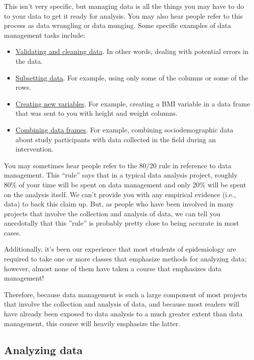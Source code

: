 \documentclass[
  letterpaper,
  DIV=11,
  numbers=noendperiod]{scrreprt}
\providecommand{\tightlist}{%
  \setlength{\itemsep}{0pt}\setlength{\parskip}{0pt}}\usepackage{longtable,booktabs,array}
\begin{document}
This isn't very specific, but managing data is all the things you may
have to do to your data to get it ready for analysis. You may also hear
people refer to this process as data wrangling or data munging. Some
specific examples of data management tasks include:

\begin{itemize}
\tightlist
\item
  \ul{Validating and cleaning data}. In other words, dealing with
  potential errors in the data.\\
\item
  \ul{Subsetting data}. For example, using only some of the columns or
  some of the rows.\\
\item
  \ul{Creating new variables}. For example, creating a BMI variable in a
  data frame that was sent to you with height and weight columns.\\
\item
  \ul{Combining data frames}. For example, combining sociodemographic
  data about study participants with data collected in the field during
  an intervention.
\end{itemize}

You may sometimes hear people refer to the 80/20 rule in reference to
data management. This ``rule'' says that in a typical data analysis
project, roughly 80\% of your time will be spent on data management and
only 20\% will be spent on the analysis itself. We can't provide you
with any empirical evidence (i.e., data) to back this claim up. But, as
people who have been involved in many projects that involve the
collection and analysis of data, we can tell you anecdotally that this
''rule'' is probably pretty close to being accurate in most cases.

Additionally, it's been our experience that most students of
epidemiology are required to take one or more classes that emphasize
methods for analyzing data; however, almost none of them have taken a
course that emphasizes data management!

Therefore, because data management is such a large component of most
projects that involve the collection and analysis of data, and because
most readers will have already been exposed to data analysis to a much
greater extent than data management, this course will heavily emphasize
the latter.

\subsection{Analyzing data}\label{analyzing-data}
\end{document}
